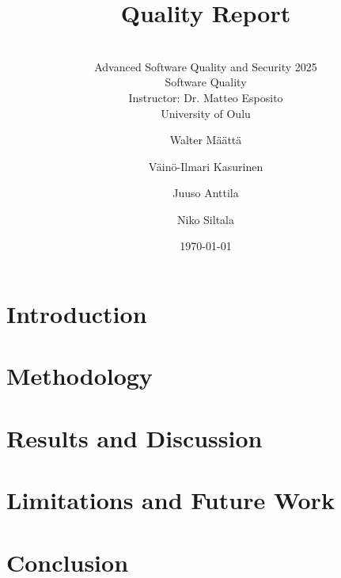\documentclass[sigconf]{acmart}
\begin{document}
\title{Quality Report}
\subtitle{\\[0.5cm] Advanced Software Quality and Security 2025 \\ Software Quality \\ Instructor: Dr. Matteo Esposito \\ University of Oulu}

\author{Walter Määttä}

\author{Väinö-Ilmari Kasurinen}

\author{Juuso Anttila}

\author{Niko Siltala}

\date{\today}


\begin{abstract}

\end{abstract}

\maketitle

\section{Introduction}


\section{Methodology}


\section{Results and Discussion}


\section{Limitations and Future Work}

\section{Conclusion}



\appendix
\end{document}
